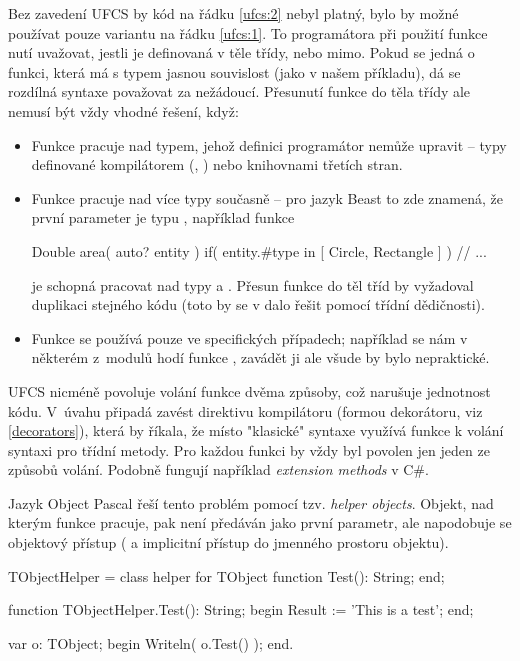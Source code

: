Bez zavedení UFCS by kód na řádku \ref{ufcs:2} nebyl platný, bylo by možné používat pouze variantu na řádku \ref{ufcs:1}. To programátora při použití funkce nutí uvažovat, jestli je definovaná v těle třídy, nebo mimo. Pokud se jedná o funkci, která má s typem jasnou souvislost (jako v našem příkladu), dá se rozdílná syntaxe považovat za nežádoucí. Přesunutí funkce do těla třídy ale nemusí být vždy vhodné řešení, když:
\begin{itemize}
	\item Funkce pracuje nad typem, jehož definici programátor nemůže upravit -- typy definované kompilátorem (, ) nebo knihovnami třetích stran.
	\item Funkce pracuje nad více typy současně --  pro jazyk Beast to zde znamená, že první parameter je typu , například funkce
	
		\begin{code}
Double area( auto? entity )
	if( entity.#type in [ Circle, Rectangle ] )
{
	// ...
}
		\end{code}
		je schopná pracovat nad typy  a . Přesun funkce do těl tříd by vyžadoval duplikaci stejného kódu (toto by se v dalo řešit pomocí třídní dědičnosti).
	\item Funkce se používá pouze ve specifických případech; například se nám v některém z~modulů hodí funkce , zavádět ji ale všude by bylo nepraktické.
\end{itemize}

UFCS nicméně povoluje volání funkce dvěma způsoby, což narušuje jednotnost kódu. V~úvahu připadá zavést direktivu kompilátoru (formou dekorátoru, viz \autoref{decorators}), která by říkala, že místo "klasické" syntaxe využívá funkce k volání syntaxi pro třídní metody. Pro každou funkci by vždy byl povolen jen jeden ze způsobů volání. Podobně fungují například \textit{extension methods} v C\#.

Jazyk Object Pascal řeší tento problém pomocí tzv. \textit{helper objects}. Objekt, nad kterým funkce pracuje, pak není předáván jako první parametr, ale napodobuje se objektový přístup ( a implicitní přístup do jmenného prostoru objektu).
\begin{pascalcode}
TObjectHelper = class helper for TObject
	function Test(): String;
end;

function TObjectHelper.Test(): String;
begin
	Result := 'This is a test';
end;

var
	o: TObject;
begin
	Writeln( o.Test() );
end.
\end{pascalcode}

